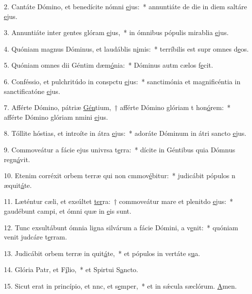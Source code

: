 2. Cantáte Dómino, et benedícite nómni \uline{e}jus:~* annuntiáte de die in diem saltáre \uline{e}jus.\par 
3. Annuntiáte inter gentes glóram \uline{e}jus,~* in ómnibus pópulis mirablia \uline{e}jus.\par 
4. Quóniam magnus Dóminus, et laudáblis n\uline{i}mis:~* terríbilis est supr omnes d\uline{e}os.\par 
5. Quóniam omnes dii Géntim dæm\uline{ó}nia:~* Dóminus autm cælos f\uline{e}cit.\par 
6. Conféssio, et pulchritúdo in conspctu \uline{e}jus:~* sanctimónia et magnificéntia in sanctificatóne \uline{e}jus.\par 
7. Afférte Dómino, pátriæ \uline{Gén}tium,~† afférte Dómino glóriam t hon\uline{ó}rem:~* afférte Dómino glóriam nmini \uline{e}jus.\par 
8. Tóllite hóstias, et introíte in átra \uline{e}jus:~* adoráte Dóminum in átri sancto \uline{e}jus.\par 
9. Commoveátur a fácie ejus univrsa t\uline{e}rra:~* dícite in Géntibus quia Dómnus regn\uline{á}vit.\par 
10. Etenim corréxit orbem terræ qui non cmmov\uline{é}bitur:~* judicábit pópulos n æquit\uline{á}te.\par 
11. Læténtur cæli, et exsúltet \uline{ter}ra:~† commoveátur mare et plenitdo \uline{e}jus:~* gaudébunt campi, et ómni quæ in \uline{e}is sunt.\par 
12. Tunc exsultábunt ómnia ligna silvárum a fácie Dómini, a v\uline{e}nit:~* quóniam venit judcáre t\uline{e}rram.\par 
13. Judicábit orbem terræ in quit\uline{á}te,~* et pópulos in vertáte s\uline{u}a.\par 
14. Glória Patr, et F\uline{í}lio,~* et Spirtui S\uline{a}ncto.\par 
15. Sicut erat in princípio, et nnc, et s\uline{e}mper,~* et in sǽcula sæclórum. \uline{A}men.\par 
